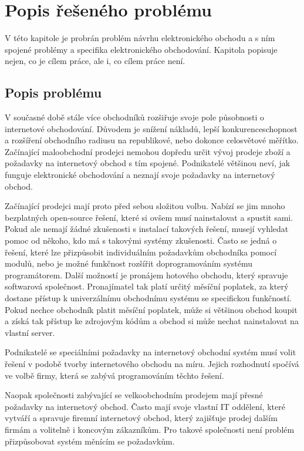 \documentclass[11pt,twoside,a4paper]{book}
\begin{document}
\chapter{Popis řešeného problému}
\label{sec:popisproblemu}

V této kapitole je probrán problém návrhu elektronického obchodu a s ním spojené problémy a specifika elektronického obchodování. Kapitola popisuje nejen, co je cílem práce, ale i, co cílem práce není.

\section{Popis problému}

V současné době stále více obchodníků rozšiřuje svoje pole působnosti o internetové obchodování. Důvodem je snížení nákladů, lepší konkurenceschopnost a rozšíření obchodního radiusu na republikové, nebo dokonce celosvětové měřítko. Začínající maloobchodní prodejci nemohou dopředu určit vývoj prodeje zboží a požadavky na internetový obchod s tím spojené. Podnikatelé většinou neví, jak funguje elektronické obchodování a neznají svoje požadavky na internetový obchod. 

Začínající prodejci mají proto před sebou složitou volbu. Nabízí se jim mnoho bezplatných open-source řešení, které si ovšem musí nainstalovat a spustit sami. Pokud ale nemají žádné zkušenosti s instalací takových řešení, musejí vyhledat pomoc od někoho, kdo má s takovými systémy zkušenosti. Často se jedná o řešení, které lze přizpůsobit individuálním požadavkům obchodníka pomocí modulů, nebo je možné funkčnost rozšířit doprogramováním systému programátorem. Další možností je pronájem hotového obchodu, který spravuje softwarová společnost. Pronajímatel tak platí určitý měsíční poplatek, za který dostane přístup k univerzálnímu obchodnímu systému se specifickou funkčností. Pokud nechce obchodník platit měsíční poplatek, může si většinou obchod koupit a získá tak přístup ke zdrojovým kódům a obchod si může nechat nainstalovat na vlastní server. 

Podnikatelé se speciálními požadavky na internetový obchodní systém musí volit řešení v podobě tvorby internetového obchodu na míru. Jejich rozhodnutí spočívá ve volbě firmy, která se zabývá programováním těchto řešení.

Naopak společnosti zabývající se velkoobchodním prodejem mají přesné požadavky na internetový obchod. Často mají svoje vlastní IT oddělení, které vytváří a spravuje firemní internetový obchod, který zajišťuje prodej dalším firmám a volitelně i koncovým zákazníkům. Pro takové společnosti není problém přizpůsobovat systém měnícím se požadavkům.
\end{document}
